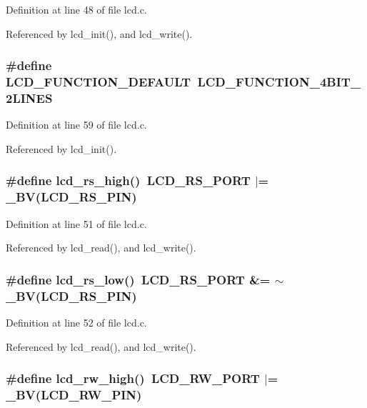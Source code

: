 Definition at line 48 of file lcd.c.

Referenced by lcd\_\-init(), and lcd\_\-write().
\subsubsection{\setlength{\rightskip}{0pt plus 5cm}\#define LCD\_\-FUNCTION\_\-DEFAULT~LCD\_\-FUNCTION\_\-4BIT\_\-2LINES}\label{lcd_8c_3e90d5d09ca0b33d440049c09b5ab244}




Definition at line 59 of file lcd.c.

Referenced by lcd\_\-init().
\subsubsection{\setlength{\rightskip}{0pt plus 5cm}\#define lcd\_\-rs\_\-high()~LCD\_\-RS\_\-PORT $|$=  \_\-BV(LCD\_\-RS\_\-PIN)}\label{lcd_8c_795b48274d3f80bc744a707b67fd93e9}




Definition at line 51 of file lcd.c.

Referenced by lcd\_\-read(), and lcd\_\-write().
\subsubsection{\setlength{\rightskip}{0pt plus 5cm}\#define lcd\_\-rs\_\-low()~LCD\_\-RS\_\-PORT \&= $\sim$\_\-BV(LCD\_\-RS\_\-PIN)}\label{lcd_8c_6edb13d59460246fb4cc32ada1c9f4a8}




Definition at line 52 of file lcd.c.

Referenced by lcd\_\-read(), and lcd\_\-write().
\subsubsection{\setlength{\rightskip}{0pt plus 5cm}\#define lcd\_\-rw\_\-high()~LCD\_\-RW\_\-PORT $|$=  \_\-BV(LCD\_\-RW\_\-PIN)}\label{lcd_8c_d0ce3cd9b481370ad4de36eff08440c8}




